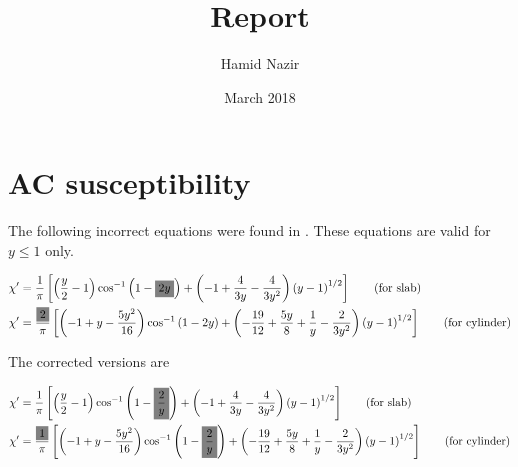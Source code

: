 \documentclass[a4paper]{article}
\title{Report}
\author{Hamid Nazir}
\date{March 2018}
\newcommand{\mathl}[2]{\colorbox{#1}{$\displaystyle #2$}}
\begin{document}
\maketitle

\section{AC susceptibility}

The following incorrect equations were found in \cite{gomory1997characterization}. These equations are valid for $y\leq 1$ only.

\begin{align*}
{\chi}' &=\frac{1}{\pi }\left [  \left ( \frac{y}{2}-1 \right ) \cos^{-1}\left (1- \mathl{gray}{2y}  \right )+ \left( -1 +\frac{4}{3y}-\frac{4}{3y^2} \right ) \left(y-1 \right )^{1/2}\right ]\tag{for slab}\\
{\chi}' &=\frac{\mathl{gray}{2}}{\pi}\left [\left (-1+y-\frac{5y^2}{16}\right ) \cos^{-1}\left ( 1-2y \right )+\left (-\frac{19}{12} + \frac{5y}{8}+\frac{1}{y}-\frac{2}{3y^2}\right ) \left (y-1 \right )^{1/2} \right ] \tag{for cylinder}
\end{align*}

The corrected versions are \cite{goldfarb1991alternating}

\begin{align*}
{\chi}' &=\frac{1}{\pi }\left [  \left (\frac{y}{2}-1  \right ) \cos^{-1}\left (1-\mathl{gray}{\frac{2}{y}}  \right )+ \left( -1 +\frac{4}{3y}-\frac{4}{3y^2} \right ) \left(y-1 \right )^{1/2}\right ]\tag{for slab}\\
{\chi}' &=\frac{\mathl{gray}{1}}{\pi}\left [\left (-1+y-\frac{5y^2}{16}\right ) \cos^{-1}\left ( 1-\mathl{gray}{\frac{2}{y}}\right )+\left (-\frac{19}{12} + \frac{5y}{8}+\frac{1}{y}-\frac{2}{3y^2}\right ) \left (y-1 \right )^{1/2} \right ]\tag{for cylinder}
\end{align*}


\end{document}

